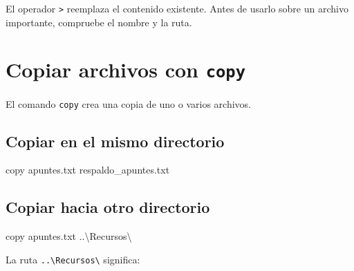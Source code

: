 \documentclass[
  spanish,
  letterpaper,
]{scrbook}
\newenvironment{Shaded}{\begin{snugshade}}{\end{snugshade}}
\newcommand{\BuiltInTok}[1]{\textcolor[rgb]{0.00,0.23,0.31}{#1}}
\newcommand{\NormalTok}[1]{\textcolor[rgb]{0.00,0.23,0.31}{#1}}
\begin{document}
\begin{tcolorbox}[enhanced jigsaw, arc=.35mm, bottomrule=.15mm, bottomtitle=1mm, breakable, colback=white, colbacktitle=quarto-callout-important-color!10!white, colframe=quarto-callout-important-color-frame, coltitle=black, left=2mm, leftrule=.75mm, opacityback=0, opacitybacktitle=0.6, rightrule=.15mm, title=\textcolor{quarto-callout-important-color}{\faExclamation}\hspace{0.5em}{Precaución}, titlerule=0mm, toprule=.15mm, toptitle=1mm]

El operador \texttt{\textgreater{}} reemplaza el contenido existente.
Antes de usarlo sobre un archivo importante, compruebe el nombre y la
ruta.

\end{tcolorbox}


\chapter{\texorpdfstring{Copiar archivos con
\texttt{copy}}{Copiar archivos con copy}}\label{copiar-archivos-con-copy}

El comando \texttt{copy} crea una copia de uno o varios archivos.

\section{Copiar en el mismo
directorio}\label{copiar-en-el-mismo-directorio}

\begin{Shaded}
\begin{Highlighting}[]
\BuiltInTok{copy}\NormalTok{ apuntes.txt respaldo\_apuntes.txt}
\end{Highlighting}
\end{Shaded}

\section{Copiar hacia otro
directorio}\label{copiar-hacia-otro-directorio}

\begin{Shaded}
\begin{Highlighting}[]
\BuiltInTok{copy}\NormalTok{ apuntes.txt ..\textbackslash{}Recursos\textbackslash{}}
\end{Highlighting}
\end{Shaded}

La ruta \texttt{..\textbackslash{}Recursos\textbackslash{}} significa:
\end{document}
